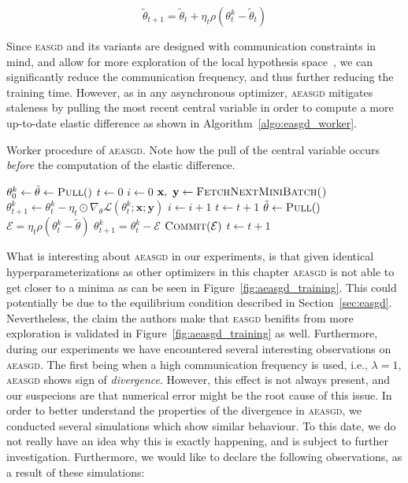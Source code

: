 \begin{equation}
  \label{eq:aeasgd_ps}
  \tilde{\theta}_{t+1} = \tilde{\theta}_t + \eta_t\rho(\theta^k_t - \tilde{\theta}_t)
\end{equation}

Since \textsc{easgd} and its variants are designed with communication constraints in mind, and allow for more exploration of the local hypothesis space~\cite{zhang2015deep}, we can significantly reduce the communication frequency, and thus further reducing the training time. However, as in any asynchronous optimizer, \textsc{aeasgd} mitigates staleness by pulling the most recent central variable in order to compute a more up-to-date elastic difference as shown in Algorithm~\ref{algo:easgd_worker}.

\begin{algorithm}[H]
  \caption{Worker procedure of \textsc{aeasgd}. Note how the pull of the central variable occurs \emph{before} the computation of the elastic difference.}
  \label{algo:aeasgd_worker}
  \begin{algorithmic}[1]
    \State $\theta^k_0 \gets \tilde{\theta} \gets \Call{Pull}$
    \State $t \gets 0$
    \State $i \gets 0$
    \State $\textbf{x},~\textbf{y} \gets \Call{FetchNextMiniBatch()}{}$
    \State $\theta^k_{t + 1} \gets \theta^k_t - \eta_t \odot \nabla_\theta \mathcal{L}(\theta^k_t;\textbf{x};\textbf{y})$
    \State $i \gets i + 1$
    \State $t \gets t + 1$
    \EndFor
    \State $\tilde{\theta} \gets \Call{Pull}$
    \State $\mathcal{E} = \eta_t\rho(\theta^k_t - \tilde{\theta})$
    \State $\theta^k_{t+1} = \theta^k_t - \mathcal{E}$
    \State $\Call{Commit}{\mathcal{E}}$
    \State $t \gets t + 1$
    \EndWhile
    \EndProcedure
  \end{algorithmic}
\end{algorithm}

What is interesting about \textsc{aeasgd} in our experiments, is that given identical hyperparameterizations as other optimizers in this chapter \textsc{aeasgd} is not able to get closer to a minima as can be seen in Figure~\ref{fig:aeasgd_training}. This could potentially be due to the equilibrium condition described in Section~\ref{sec:easgd}. Nevertheless, the claim the authors make that \textsc{easgd} benifits from more exploration is validated in Figure~\ref{fig:aeasgd_training} as well. Furthermore, during our experiments we have encountered several interesting observations on \textsc{aeasgd}. The first being when a high communication frequency is used, i.e., $\lambda = 1$, \textsc{aeasgd} shows sign of \emph{divergence}. However, this effect is not always present, and our suspecions are that numerical error might be the root cause of this issue. In order to better understand the properties of the divergence in \textsc{aeasgd}, we conducted several simulations which show similar behaviour. To this date, we do not really have an idea why this is exactly happening, and is subject to further investigation. Furthermore, we would like to declare the following observations, as a result of these simulations:

